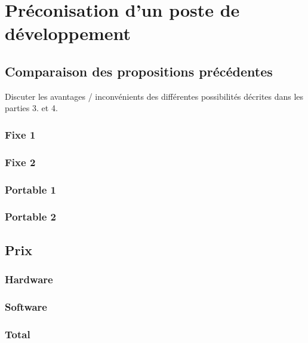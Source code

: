 \chapter{Préconisation d'un poste de développement}

\section{Comparaison des propositions précédentes}

Discuter les avantages / inconvénients des différentes possibilités décrites dans les parties 3. et 4.

\subsection{Fixe 1}
\subsection{Fixe 2}
\subsection{Portable 1}
\subsection{Portable 2}

\section{Prix}

\subsection{Hardware}

\subsection{Software}

\subsection{Total}